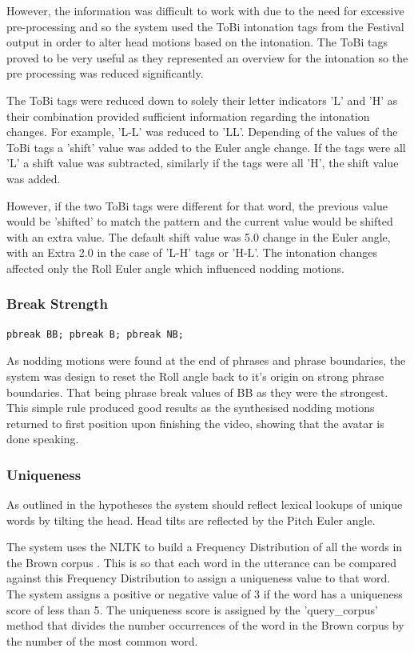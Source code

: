 \documentclass[bsc,frontabs,twoside,singlespacing,parskip]{infthesis}
\begin{document}
However, the information was difficult to work with due to the need for excessive pre-processing and so the system used the ToBi intonation tags from the Festival output in order to alter head motions based on the intonation. The ToBi tags proved to be very useful as they represented an overview for the intonation so the pre processing was reduced significantly.

The ToBi tags were reduced down to solely their letter indicators 'L' and 'H' as their combination provided sufficient information regarding the intonation changes. For example, 'L\*-L' was reduced to 'LL'. Depending of the values of the ToBi tags a 'shift' value was added to the Euler angle change. If the tags were all 'L' a shift value was subtracted, similarly if the tags were all 'H', the shift value was added. 

However, if the two ToBi tags were different for that word, the previous value would be 'shifted' to match the pattern and the current value would be shifted with an extra value. The default shift value was 5.0 change in the Euler angle, with an Extra 2.0 in the case of 'L-H' tags or 'H-L'. The intonation changes affected only the Roll Euler angle which influenced nodding motions.

\subsubsection{Break Strength}

\begin{lstlisting}
pbreak BB; pbreak B; pbreak NB;
\end{lstlisting}

As nodding motions were found at the end of phrases and phrase boundaries, the system was design to reset the Roll angle back to it's origin on strong phrase boundaries. That being phrase break values of BB as they were the strongest. This simple rule produced good results as the synthesised nodding motions returned to first position upon finishing the video, showing that the avatar is done speaking.

\subsubsection{Uniqueness}

As outlined in the hypotheses the system should reflect lexical lookups of unique words by tilting the head. Head tilts are reflected by the Pitch Euler angle.

The system uses the NLTK to build a Frequency Distribution of all the words in the Brown corpus \cite{brown}. This is so that each word in the utterance can be compared against this Frequency Distribution to assign a uniqueness value to that word. The system assigns a positive or negative value of 3 if the word has a uniqueness score of less than 5. The uniqueness score is assigned by the 'query\_corpus' method that divides the number occurrences of the word in the Brown corpus by the number of the most common word.
\end{document}
